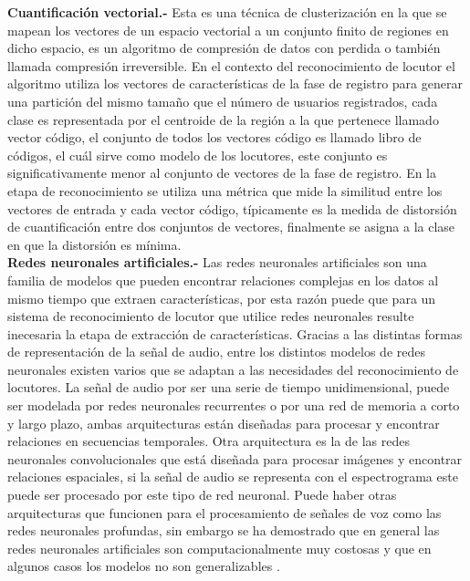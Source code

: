 \textbf{Cuantificaci\'on vectorial.- } Esta es una t\'ecnica de clusterizaci\'on en la que se mapean los vectores de un espacio vectorial a un conjunto finito de regiones en dicho espacio, es un algoritmo de compresi\'on de datos con perdida o tambi\'en llamada compresi\'on irreversible. En el contexto del reconocimiento de locutor el algoritmo utiliza los vectores de caracter\'isticas de la fase de registro para generar una partici\'on del mismo tamaño que el n\'umero de usuarios registrados, cada clase es representada por el centroide de la regi\'on a la que pertenece llamado vector c\'odigo, el conjunto de todos los vectores c\'odigo es llamado libro de c\'odigos, el cu\'al sirve como modelo de los locutores, este conjunto es significativamente menor al conjunto de vectores de la fase de registro. En la etapa de reconocimiento se utiliza una m\'etrica que mide la similitud entre los vectores de entrada y cada vector c\'odigo, t\'ipicamente es la medida de distorsi\'on de cuantificaci\'on entre dos conjuntos de vectores, finalmente se asigna a la clase en que la distorsi\'on es m\'inima.\\

\textbf{Redes neuronales artificiales.- } Las redes neuronales artificiales son una familia de modelos que pueden encontrar relaciones complejas en los datos al mismo tiempo que extraen caracter\'isticas, por esta raz\'on puede que para un sistema de reconocimiento de locutor que utilice redes neuronales resulte inecesaria la etapa de extracci\'on de caracter\'isticas. Gracias a las distintas formas de representaci\'on de la señal de audio, entre los distintos modelos de redes neuronales existen varios que se adaptan a las necesidades del reconocimiento de locutores. La señal de audio por ser una serie de tiempo unidimensional, puede ser modelada por redes neuronales recurrentes o por una red de memoria a corto y largo plazo, ambas arquitecturas est\'an diseñadas para procesar y encontrar relaciones en secuencias temporales. Otra arquitectura es la de las redes neuronales convolucionales que est\'a diseñada para procesar im\'agenes y encontrar relaciones espaciales, si la señal de audio se representa con el espectrograma este puede ser procesado por este tipo de red neuronal. Puede haber otras arquitecturas que funcionen para el procesamiento de señales de voz como las redes neuronales profundas, sin embargo se ha demostrado que en general las redes neuronales artificiales son computacionalmente muy costosas y que en algunos casos los modelos no son generalizables \cite{reynolds2002}.\\

